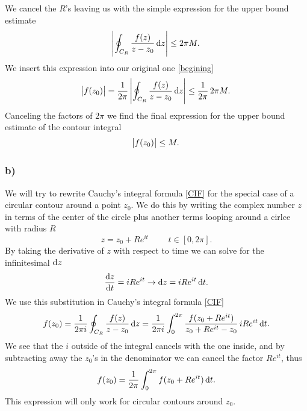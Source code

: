 \documentclass[12pt,twoside]{article}
\begin{document}
We cancel the $R$'s leaving us with the simple expression for the upper bound estimate
\begin{equation}
  \abs{\oint_{C_R} \frac{f(z)}{z-z_0}\dif z} \leq 2\pi M.
\end{equation}
We insert this expression into our original one \eqref{begining}
\begin{equation}
  \abs{f(z_0)} = \frac{1}{2\pi}\,\abs{\oint_{C_R} \frac{f(z)}{z-z_0}\dif z} \leq \frac{1}{2\pi} \, 2\pi M.
\end{equation}
Canceling the factors of $2\pi$ we find the final expression for the upper bound estimate of the contour integral
\begin{equation}
  \abs{f(z_0)} \leq M.
\end{equation}

\subsubsection*{b)}
We will try to rewrite Cauchy's integral formula \eqref{CIF} for the special case of a circular contour around a point $z_0$. We do this by writing the complex number $z$ in terms of the center of the circle plus another terms looping around a cirlce with radius $R$
\begin{equation}
  z = z_0 + R e^{it} \,\,\qquad t \in [0, 2\pi].
\end{equation}
By taking the derivative of $z$ with respect to time we can solve for the infinitesimal $\dif z$
\begin{equation}
  \frac{\dif z}{\dif t} = iRe^{it} \rightarrow \dif z = iRe^{it} \dif t.
\end{equation}
We use this substitution in Cauchy's integral formula \eqref{CIF}
\begin{equation}
  f(z_0) = \frac{1}{2\pi i} \oint_{C_R} \frac{f(z)}{z-z_0}\dif z = \frac{1}{2\pi i} \int_{0}^{2\pi} \frac{f(z_0+Re^{it})}{z_0+Re^{it}-z_0}\,iRe^{it} \dif t.
\end{equation}
We see that the $i$ outside of the integral cancels with the one inside, and by subtracting away the $z_0$'s in the denominator we can cancel the factor $Re^{it}$, thus
\begin{equation}
  f(z_0) = \frac{1}{2\pi} \int_{0}^{2\pi} f(z_0+Re^{it}) \dif t. \label{answer1b}
\end{equation}
This expression will only work for circular contours around $z_0$.
\end{document}
